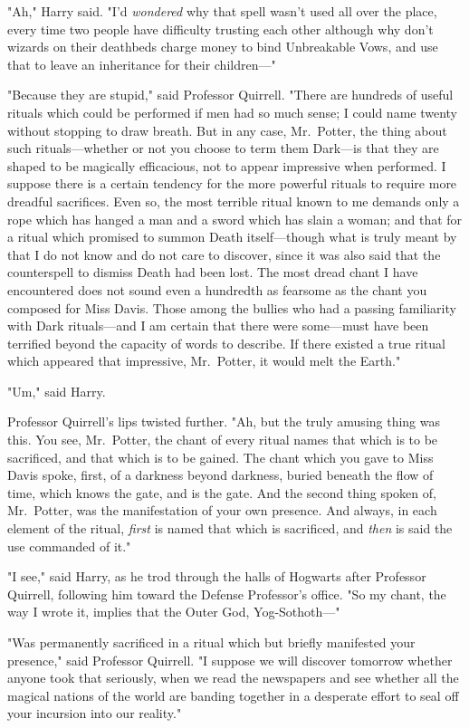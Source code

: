 "Ah," Harry said. "I'd \emph{wondered} why that spell wasn't used all over the
place, every time two people have difficulty trusting each other{\el}
although{\el} why don't wizards on their deathbeds charge money to bind
Unbreakable Vows, and use that to leave an inheritance for their children\mbox{---}"

"Because they are stupid," said Professor Quirrell. "There are hundreds of
useful rituals which could be performed if men had so much sense; I could name
twenty without stopping to draw breath. But in any case, Mr.~Potter, the thing
about such rituals---whether or not you choose to term them Dark---is that they
are shaped to be magically efficacious, not to appear impressive when
performed. I suppose there is a certain tendency for the more powerful rituals
to require more dreadful sacrifices. Even so, the most terrible ritual known to
me demands only a rope which has hanged a man and a sword which has slain a
woman; and that for a ritual which promised to summon Death itself---though
what is truly meant by that I do not know and do not care to discover, since it
was also said that the counterspell to dismiss Death had been lost. The most
dread chant I have encountered does not sound even a hundredth as fearsome as
the chant you composed for Miss Davis. Those among the bullies who had a
passing familiarity with Dark rituals---and I am certain that there were
some---must have been terrified beyond the capacity of words to describe. If
there existed a true ritual which appeared that impressive, Mr.~Potter, it
would melt the Earth."

"Um," said Harry.

Professor Quirrell's lips twisted further. "Ah, but the truly amusing thing was
this. You see, Mr.~Potter, the chant of every ritual names that which is to be
sacrificed, and that which is to be gained. The chant which you gave to Miss
Davis spoke, first, of a darkness beyond darkness, buried beneath the flow of
time, which knows the gate, and is the gate. And the second thing spoken of,
Mr.~Potter, was the manifestation of your own presence. And always, in each
element of the ritual, \emph{first} is named that which is sacrificed, and
\emph{then} is said the use commanded of it."

"I{\el} see," said Harry, as he trod through the halls of Hogwarts after
Professor Quirrell, following him toward the Defense Professor's office. "So my
chant, the way I wrote it, implies that the Outer God, Yog-Sothoth\mbox{---}"

"Was permanently sacrificed in a ritual which but briefly manifested your
presence," said Professor Quirrell. "I suppose we will discover tomorrow
whether anyone took that seriously, when we read the newspapers and see whether
all the magical nations of the world are banding together in a desperate effort
to seal off your incursion into our reality."

